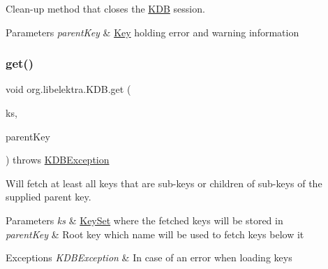 Clean-\/up method that closes the \mbox{\hyperlink{classorg_1_1libelektra_1_1KDB}{K\+DB}} session. 


\begin{DoxyParams}{Parameters}
{\em parent\+Key} & \mbox{\hyperlink{classorg_1_1libelektra_1_1Key}{Key}} holding error and warning information \\
\hline
\end{DoxyParams}
\mbox{\label{classorg_1_1libelektra_1_1KDB_ac3b5b3551a9fef5dae1fb468e74272f6}} 
\subsubsection{\texorpdfstring{get()}{get()}\hspace{0.1cm}{\footnotesize\ttfamily [1/2]}}
{\footnotesize\ttfamily void org.\+libelektra.\+K\+D\+B.\+get (\begin{DoxyParamCaption}\item[{final \mbox{\hyperlink{classorg_1_1libelektra_1_1KeySet}{Key\+Set}}}]{ks,  }\item[{final \mbox{\hyperlink{classorg_1_1libelektra_1_1Key}{Key}}}]{parent\+Key }\end{DoxyParamCaption}) throws \mbox{\hyperlink{classorg_1_1libelektra_1_1exception_1_1KDBException}{K\+D\+B\+Exception}}\hspace{0.3cm}{\ttfamily [inline]}}



Will fetch at least all keys that are sub-\/keys or children of sub-\/keys of the supplied parent key. 


\begin{DoxyParams}{Parameters}
{\em ks} & \mbox{\hyperlink{classorg_1_1libelektra_1_1KeySet}{Key\+Set}} where the fetched keys will be stored in \\
\hline
{\em parent\+Key} & Root key which name will be used to fetch keys below it \\
\hline
\end{DoxyParams}

\begin{DoxyExceptions}{Exceptions}
{\em K\+D\+B\+Exception} & In case of an error when loading keys \\
\hline
\end{DoxyExceptions}
\mbox{\label{classorg_1_1libelektra_1_1KDB_a600abc786bde91a3122bd96be991a3d5}} 
